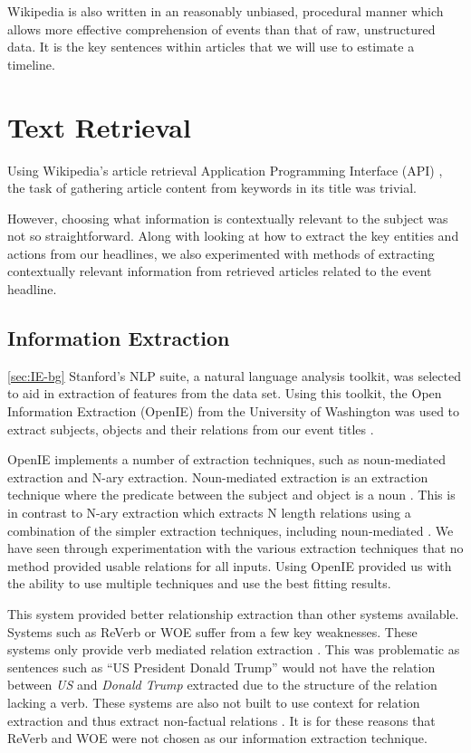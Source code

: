 \documentclass[bsc,frontabs,twoside,singlespacing,parskip,deptreport]{infthesis}     %
\begin{document}
Wikipedia is also written in an reasonably unbiased, procedural manner which allows more effective comprehension of events
than that of raw, unstructured data.
It is the key sentences within articles that we will use to estimate a timeline.

\section{Text Retrieval}\label{sec:retrieval}
Using Wikipedia's article retrieval Application Programming Interface (API) \cite{wikipediaAPI}, the task of gathering article content
from keywords in its title was trivial.

However, choosing what information is contextually relevant to the subject was not so straightforward.
Along with looking at how to extract the key entities and actions from our 
headlines, we also experimented with methods of extracting contextually relevant information from
retrieved articles related to the event headline.

\subsection{Information Extraction}\ref{sec:IE-bg}
Stanford's NLP suite,
a natural language analysis toolkit,
was selected to aid in extraction of features from the data set.
Using this toolkit, the Open Information Extraction (OpenIE) from
the University of Washington was used to extract subjects, objects
and their relations from our event titles \cite{schmitz2012open}.


OpenIE implements a number of extraction techniques, such as noun-mediated extraction and N-ary extraction.
Noun-mediated extraction is an extraction technique where the predicate between the subject and object is a noun \cite{mirrezaei2015triplex}.
This is in contrast to N-ary extraction which extracts N length relations using a combination of the simpler extraction techniques, including noun-mediated \cite{akbik2012kraken}. 
We have seen through experimentation with the various extraction techniques that no method provided
usable relations for all inputs. Using OpenIE provided us with the ability to use multiple techniques and
use the best fitting results.

This system provided better relationship extraction than other systems available. Systems such as
ReVerb\cite{fader2011identifying} or WOE\cite{wu2010open} suffer from a few key weaknesses. These systems only provide verb mediated relation extraction \cite{schmitz2012open}.
This was problematic as sentences such as ``US President Donald Trump'' would not have the relation between \textit{US} and \textit{Donald Trump} extracted due to the structure of the relation lacking a verb.
These systems are also not built to use context for relation extraction and thus extract non-factual relations \cite{schmitz2012open}.
It is for these reasons that ReVerb and WOE were not chosen as our information extraction technique.
\end{document}
